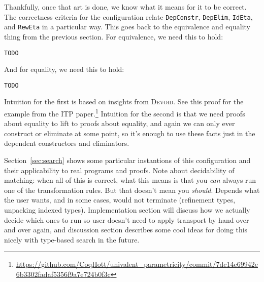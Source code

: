 Thankfully, once that art is done, we know what it means for it to be correct.
The correctness criteria for the configuration relate \lstinline{DepConstr}, \lstinline{DepElim}, \lstinline{IdEta}, and \lstinline{RewEta}
in a particular way.
This goes back to the equivalence and equality thing from the previous section.
For equivalence, we need this to hold:

\begin{lstlisting}
TODO
\end{lstlisting}
And for equality, we need this to hold:

\begin{lstlisting}
TODO
\end{lstlisting}
Intuition for the first is based on insights from \textsc{Devoid}.
See this proof for the example from the ITP paper.\footnote{\url{https://github.com/CoqHott/univalent_parametricity/commit/7dc14e69942e6b3302fadaf5356f9a7e724b0f3c}}
Intuition for the second is that we need proofs about equality to lift to proofs about equality,
and again we can only ever construct or eliminate at some point, so it's enough
to use these facts just in the dependent constructors and eliminators.

Section~\ref{sec:search} shows some particular instantions of this configuration and their applicability to real programs and proofs.
Note about decidability of matching: when all of this is correct, what this means is that you \textit{can} always
run one of the transformation rules. But that doesn't mean you \textit{should}. Depends what the user wants,
and in some cases, would not terminate (refinement types, unpacking indexed types). Implementation section will
discuss how we actually decide which ones to run so user doesn't need to apply transport by hand over and over again,
and discussion section describes some cool ideas for doing this nicely with type-based search in the future.



